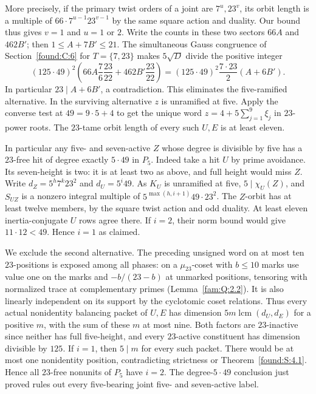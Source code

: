 \documentclass[11pt,a4paper]{article}
\numberwithin{equation}{section}
\theoremstyle{remark}
\begin{document}
More precisely, if the primary twist orders of a joint are
$7^u,23^v$, its orbit length is a multiple of
$66\cdot7^{u-1}23^{v-1}$ by the same square action and duality.
Our bound thus gives $v=1$ and $u=1$ or $2$. Write the counts in
these two sectors $66A$ and $462B'$; then $1\le A+7B'\le21$.
The simultaneous Gauss congruence of Section~\ref{found:C:6} for $T=\{7,23\}$
makes $5\sqrt D$ divide the positive integer
\[
 (125\cdot49)^2
 \left(66A\frac{7}{6}\frac{23}{22}
            +462B'\frac{23}{22}\right)
 =(125\cdot49)^2\frac{7\cdot23}{2}(A+6B').
\]
In particular $23\mid A+6B'$, a contradiction. This eliminates
the five-ramified alternative.
In the surviving alternative $z$ is unramified at five. Apply the
converse test at $49=9\cdot5+4$ to get the unique word
$z=4+5\sum_{j=1}^9\xi_j$ in $23$-power roots. The $23$-tame
orbit length of every such $U,E$ is at least eleven.

In particular any five- and seven-active $Z$ whose degree is divisible
by five has a $23$-free hit of degree exactly $5\cdot49$ in $P_5$.
Indeed take a hit $U$ by prime avoidance. Its seven-height is two:
it is at least two as above, and full height would miss $Z$.
Write $d_Z=5^h7^k23^2$ and $d_U=5^i49$. As $K_U$ is unramified at
five, $5\mid\chi_U(Z)$, and $S_{UZ}$ is a nonzero integral multiple
of $5^{\max(h,i+1)}49\cdot23^2$. The $Z$-orbit has at least twelve
members, by the square twist action and odd duality. At least eleven
inertia-conjugate $U$ rows agree there. If $i=2$, their norm bound
would give $11\cdot12<49$. Hence $i=1$ as claimed.

We exclude the second alternative. The preceding unsigned
word on at most ten $23$-positions is exposed among all phases: on a
$\mu_{23}$-coset with $b\le10$ marks use value one on the marks
and $-b/(23-b)$ at unmarked positions, tensoring with normalized trace at complementary primes (Lemma~\ref{fam:Q:2.2}). It is also linearly
independent on its support by the cyclotomic coset relations. Thus
every actual nonidentity balancing packet of $U,E$ has dimension
$5m\operatorname{lcm}(d_U,d_E)$ for a positive $m$, with the sum of
these $m$ at most nine. Both factors are $23$-inactive since neither
has full five-height, and every $23$-active constituent has dimension
divisible by $125$. If $i=1$, then $5\mid m$ for every such packet.
There would be at most one nonidentity position, contradicting
strictness or Theorem~\ref{found:S:4.1}. Hence all $23$-free nonunits of
$P_5$ have $i=2$. The degree-$5\cdot49$ conclusion just proved rules
out every five-bearing joint five- and seven-active label.
\end{document}
